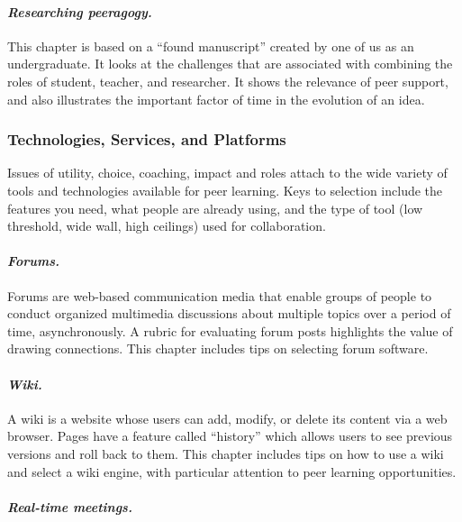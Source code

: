 \paragraph{\emph{Researching peeragogy.}}\label{researching-peeragogy.}

This chapter is based on a ``found manuscript'' created by one of us as
an undergraduate. It looks at the challenges that are associated with
combining the roles of student, teacher, and researcher. It shows the
relevance of peer support, and also illustrates the important factor of
time in the evolution of an idea.

\subsubsection{Technologies, Services, and
Platforms}\label{technologies-services-and-platforms}

Issues of utility, choice, coaching, impact and roles attach to the wide
variety of tools and technologies available for peer learning. Keys to
selection include the features you need, what people are already using,
and the type of tool (low threshold, wide wall, high ceilings) used for
collaboration.

\paragraph{\emph{Forums.}}\label{forums.}

Forums are web-based communication media that enable groups of people to
conduct organized multimedia discussions about multiple topics over a
period of time, asynchronously. A rubric for evaluating forum posts
highlights the value of drawing connections. This chapter includes tips
on selecting forum software.

\paragraph{\emph{Wiki.}}\label{wiki.}

A wiki is a website whose users can add, modify, or delete its content
via a web browser. Pages have a feature called ``history'' which allows
users to see previous versions and roll back to them. This chapter
includes tips on how to use a wiki and select a wiki engine, with
particular attention to peer learning opportunities.

\paragraph{\emph{Real-time meetings.}}\label{real-time-meetings.}

